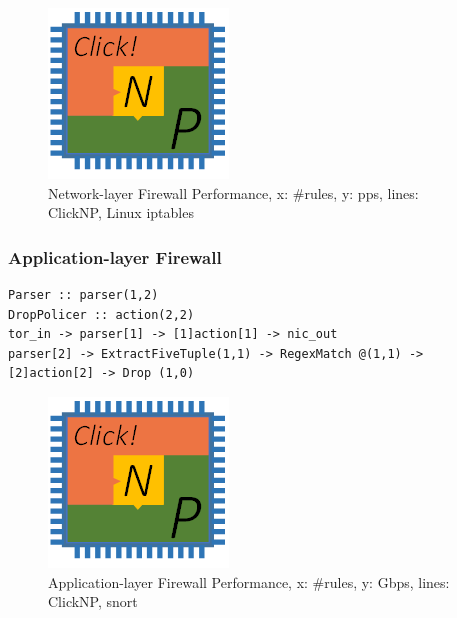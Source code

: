 {\begin{figure}[h!]
	\centering
	\includegraphics[width=0.6\columnwidth]{image/logo}
	\vspace{-0.15in}
	\caption{Network-layer Firewall Performance, x: \#rules, y: pps, lines: ClickNP, Linux iptables}
	\vspace{-0.15in}
	\label{clicknp:fig:FirewallPerformance}
\end{figure}

\subsubsection{Application-layer Firewall}

\begin{lstlisting}
Parser :: parser(1,2)
DropPolicer :: action(2,2)
tor_in -> parser[1] -> [1]action[1] -> nic_out
parser[2] -> ExtractFiveTuple(1,1) -> RegexMatch @(1,1) -> [2]action[2] -> Drop (1,0)
\end{lstlisting}

\begin{figure}[h!]
	\centering
	\includegraphics[width=0.6\columnwidth]{image/logo}
	\vspace{-0.15in}
	\caption{Application-layer Firewall Performance, x: \#rules, y: Gbps, lines: ClickNP, snort \cite{roesch1999snort}}
	\vspace{-0.15in}
	\label{clicknp:fig:WAF_Performance}
\end{figure}

}
